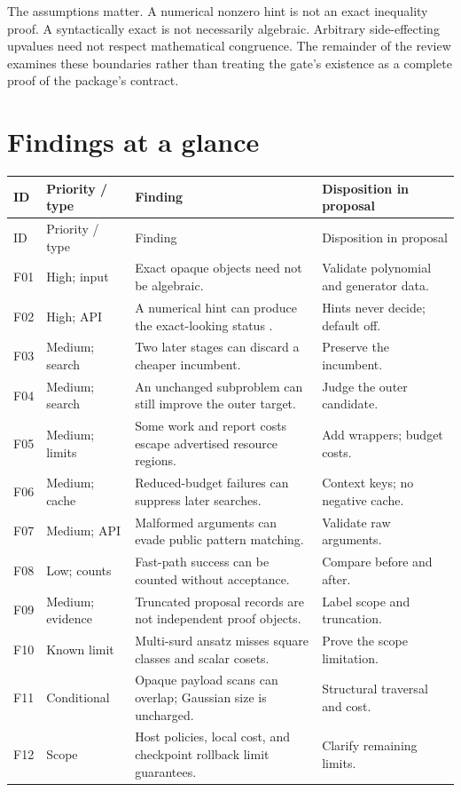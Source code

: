 \documentclass[11pt,a4paper]{article}
\newcommand{\code}[1]{\texttt{\detokenize{#1}}}
\theoremstyle{remark}\newtheorem{remark}[theorem]{Remark}
\begin{document}
The assumptions matter. A numerical nonzero hint is not an exact inequality proof. A syntactically exact \code{Root} is not necessarily algebraic. Arbitrary side-effecting upvalues need not respect mathematical congruence. The remainder of the review examines these boundaries rather than treating the gate's existence as a complete proof of the package's contract.

\section{Findings at a glance}
\small
\begin{longtable}{@{}>{\raggedright\arraybackslash}p{}>{\raggedright\arraybackslash}p{}>{\raggedright\arraybackslash}p{}>{\raggedright\arraybackslash}p{}@{}}
\toprule ID & Priority / type & Finding & Disposition in proposal\\\midrule
\endfirsthead
\toprule ID & Priority / type & Finding & Disposition in proposal\\\midrule
\endhead
\bottomrule\endfoot
F01 & High; input & Exact opaque objects need not be algebraic. & Validate polynomial and generator data.\\
F02 & High; API & A numerical hint can produce the exact-looking status \code{"Different"}. & Hints never decide; default off.\\
F03 & Medium; search & Two later stages can discard a cheaper incumbent. & Preserve the incumbent.\\
F04 & Medium; search & An unchanged subproblem can still improve the outer target. & Judge the outer candidate.\\
F05 & Medium; limits & Some work and report costs escape advertised resource regions. & Add wrappers; budget costs.\\
F06 & Medium; cache & Reduced-budget failures can suppress later searches. & Context keys; no negative cache.\\
F07 & Medium; API & Malformed arguments can evade public pattern matching. & Validate raw arguments.\\
F08 & Low; counts & Fast-path success can be counted without acceptance. & Compare before and after.\\
F09 & Medium; evidence & Truncated proposal records are not independent proof objects. & Label scope and truncation.\\
F10 & Known limit & Multi-surd ansatz misses square classes and scalar cosets. & Prove the scope limitation.\\
F11 & Conditional & Opaque payload scans can overlap; Gaussian size is uncharged. & Structural traversal and cost.\\
F12 & Scope & Host policies, local cost, and checkpoint rollback limit guarantees. & Clarify remaining limits.\\
\end{longtable}
\normalsize
\end{document}
